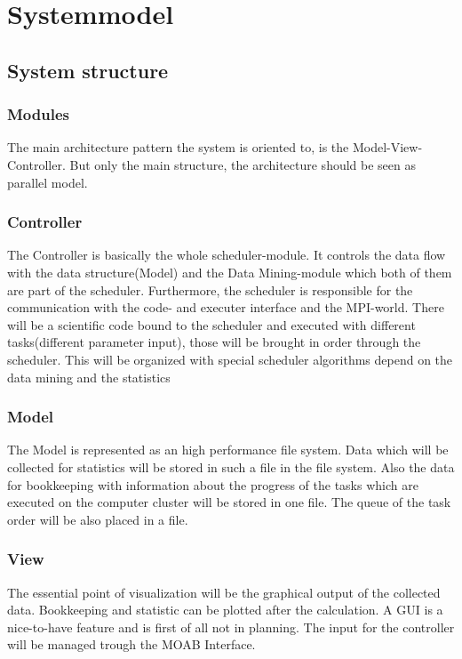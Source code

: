 \section{Systemmodel}
	\subsection{System structure}
			\subsubsection{Modules}
				The main architecture pattern the system is oriented to, is the Model-View-Controller. But 				only the main structure, the architecture should be seen as parallel model.
			\subsubsection{Controller}
				The Controller is basically the whole scheduler-module. It controls the data flow with the 				data structure(Model) and the Data Mining-module which both of them are part of the 						scheduler. Furthermore, the scheduler is responsible for the communication with the code-             				and executer interface and the MPI-world. There will be a scientific code bound to the 						scheduler and executed with different tasks(different parameter input), those will be 						brought in order through the scheduler. This will be organized with special scheduler 						algorithms depend on the data mining and the statistics
			\subsubsection{Model}
				The Model is represented as an high performance file system. Data which will be collected 					for statistics will be stored in such a file in the file system. Also the data for 							bookkeeping with information about the progress of the tasks which are executed on the 						computer cluster will be stored in one file. The queue of the task order will be also 						placed in a file. 
			\subsubsection{View}
				The essential point of visualization will be the graphical output of the collected data. 					Bookkeeping and statistic can be plotted after the calculation.
				A GUI is a nice-to-have feature and is first of all not in planning. The input for the 						controller will be managed trough the MOAB Interface.
\newpage
